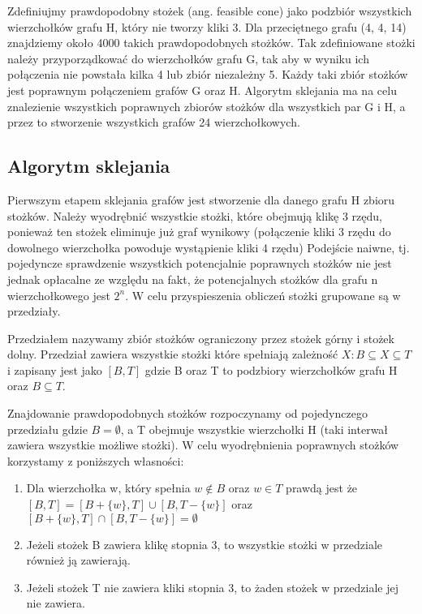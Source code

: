 \documentclass[11pt]{article}
\begin{document}
Zdefiniujmy prawdopodobny stożek (ang. feasible cone) jako podzbiór wszystkich wierzchołków grafu H, który nie tworzy kliki 3.
Dla przeciętnego grafu (4, 4, 14) znajdziemy około 4000 takich prawdopodobnych stożków. 
Tak zdefiniowane stożki należy przyporządkować do wierzchołków  grafu G, tak aby w wyniku ich połączenia nie powstała kilka 4 lub zbiór niezależny 5. Każdy taki zbiór stożków jest poprawnym połączeniem grafów G oraz H. Algorytm sklejania ma na celu znalezienie wszystkich poprawnych zbiorów stożków dla wszystkich par G i H, a przez to stworzenie wszystkich grafów 24 wierzchołkowych.


\subsection{Algorytm sklejania}
Pierwszym etapem sklejania grafów jest stworzenie dla danego grafu H zbioru stożków. Należy wyodrębnić wszystkie stożki, które obejmują klikę 3 rzędu, ponieważ ten stożek eliminuje już graf wynikowy (połączenie kliki 3 rzędu do dowolnego wierzchołka powoduje wystąpienie kliki 4 rzędu) Podejście naiwne, tj. pojedyncze sprawdzenie wszystkich potencjalnie poprawnych stożków nie jest jednak opłacalne ze względu na fakt, że potencjalnych stożków dla grafu n wierzchołkowego jest $2^n$. W celu przyspieszenia obliczeń stożki grupowane są w przedziały. 

Przedziałem nazywamy zbiór stożków ograniczony przez stożek górny i stożek dolny. Przedział zawiera wszystkie stożki które spełniają zależność  $X: B \subseteq X \subseteq T$ i zapisany jest jako $[B, T]$ gdzie B oraz T to podzbiory wierzchołków grafu H oraz $B \subseteq  T$. 

Znajdowanie prawdopodobnych stożków rozpoczynamy od pojedynczego przedziału gdzie $B = \emptyset$, a T obejmuje wszystkie wierzchołki H (taki interwał zawiera wszystkie możliwe stożki). W celu wyodrębnienia poprawnych stożków korzystamy z poniższych własności:
\begin{enumerate}
\item Dla wierzchołka w, który spełnia $w \notin B$ oraz $w\in T$ prawdą jest że $[B, T] = [B + \{ w\}, T] \cup [B , T - \{ w\}]$ oraz $[B +\{ w\}, T] \cap [B , T - \{ w\}] = \emptyset$

\item Jeżeli stożek B zawiera klikę stopnia 3, to wszystkie stożki w przedziale również ją zawierają. 

\item Jeżeli stożek T nie zawiera kliki stopnia 3, to żaden stożek w przedziale jej nie zawiera.
\end{enumerate}
\end{document}
